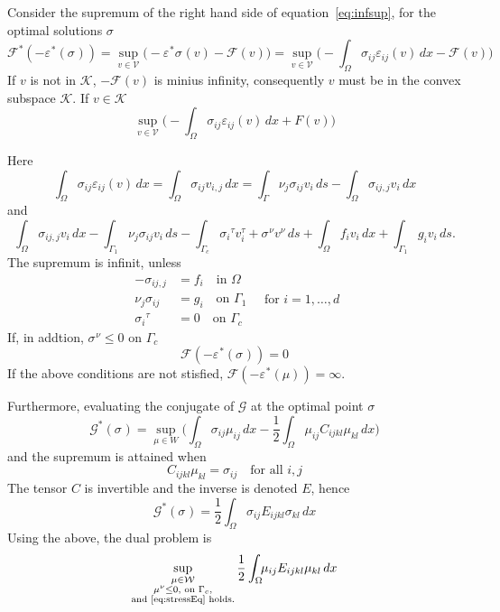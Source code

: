\documentclass[12pt,a4paper]{article}
\numberwithin{equation}{section}
\numberwithin{table}{section}
\numberwithin{figure}{section}
\newcommand{\W}{\ensuremath{\mathcal{W}}}
\newcommand{\half}{\ensuremath{\frac{1}{2}}}
\newcommand{\V}{\ensuremath{\mathcal{V}}}
\newcommand{\K}{\ensuremath{\mathcal{K}}}
\newcommand{\F}{\ensuremath{{\mathcal F}}}
\newcommand{\G}{\ensuremath{{\mathcal G}}}
\newcommand{\intO}{\int_\Omega\!\!}
\newcommand{\intG}[1][0]{\int_{\Gamma_{#1}}\!\!}
\renewcommand{\epsilon}{\varepsilon}
\newcommand{\strain}[1][]{\ensuremath{\epsilon_{#1}}}
\newcommand{\epsij}{\strain[ij]}
\newcommand{\stress}[1][]{\ensuremath{\sigma_{#1}}}
\newcommand{\dx}{{\,dx}}
\newcommand{\ds}{{\,ds}}
\begin{document}
Consider the supremum of the right hand side of equation~\eqref{eq:infsup}, for the optimal solutions $\stress$
\begin{equation}
  \F^*(-\strain^*(\stress)) = \sup_{v \in \V} \bigl(-\strain^* \stress(v)
   - \F(v)\bigr)
  = \sup_{v\in \V} \bigl(-\intO \stress[ij]\epsij(v) \dx - \F(v) \bigr)
\end{equation}
If $v$ is not in $\K$, $-\F(v)$ is minius infinity, consequently $v$ must be in the convex subspace $\K$. If $v\in \K$
\begin{equation}
  \sup_{v\in\V} \bigl(-\intO \stress[ij]\epsij(v) \dx + F(v) \bigr)
\end{equation}

Here
\begin{equation}
  \intO \stress[ij] \epsij(v) \dx = \intO \stress[ij] v_{i,j} \dx
  = \int_\Gamma \nu_j \stress[ij] v_i \ds - \intO \stress[ij,j] v_i \dx
\end{equation}
and
\begin{equation}
  \intO \stress[ij,j] v_i \dx - \intG[1] \nu_j \stress[ij] v_i \ds 
  - \intG[c] \stress[i]^\tau v^\tau_i + \stress^\nu v^\nu \ds + \intO f_i v_i \dx
  +   \intG[1] g_i v_i\ds.
\end{equation}
The supremum is infinit, unless
\begin{equation}
  \label{eq:stressEq}
  \begin{split}
    -\stress[ij,j] &= f_i \quad\text{in $\Omega$} \\
    \nu_j \stress[ij] &= g_i \quad\text{on $\Gamma_1$} \\
    \stress[i]^\tau &= 0 \quad\text{on $\Gamma_c$}      
  \end{split}
  \quad\text{for $i=1,\ldots,d$}
\end{equation} 
If, in addtion, $\stress^\nu \le 0$ on $\Gamma_c$
\begin{equation}
  \F(-\strain^*(\stress)) = 0
\end{equation}
If the above conditions are not stisfied, $\F(-\strain^*(\mu)) = \infty$.

Furthermore, evaluating the conjugate of $\G$ at the optimal point $\stress$
\begin{equation}
  \G^*(\stress) = \sup_{\mu\in W} \bigl(\intO \stress[ij] \mu_{ij} \dx
   - \half \intO \mu_{ij} C_{ijkl} \mu_{kl} \dx \bigr)
\end{equation}
and the supremum is attained when
\begin{equation}
  C_{ijkl} \mu_{kl} = \stress[ij] \quad\text{for all $i,j$}
\end{equation}
The tensor $C$ is invertible and the inverse is denoted $E$, hence
\begin{equation}
  \G^*(\stress) = \half \intO \stress[ij] E_{ijkl} \stress[kl] \dx
\end{equation}
Using the above, the dual problem is
\begin{equation}
  \sup_{\substack{\mu\in\W \\ \mu^{\nu} \le 0, \text{ on $\Gamma_c$}, \\
   \text{and \eqref{eq:stressEq} holds.}}}
  \half \intO \mu_{ij} E_{ijkl} \mu_{kl} \dx
\end{equation}
\end{document}
